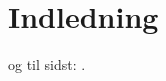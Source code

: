 \chapter{Indledning}


\lipsum[5-7] \cite{websiteAttac6hedProperties} og til sidst: \cite{websiteCustomWindow}.